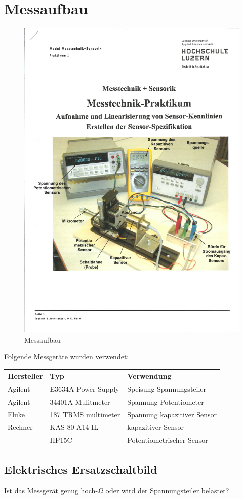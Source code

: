 \section{Messaufbau}


\begin{figure}[H]
    \centering
    \includegraphics[scale=0.8,trim={0.5cm 6cm 0 10.5cm},clip]{pic/aufbau.pdf}
    \caption{Messaufbau}
    \label{fig:messaufbau}
\end{figure}

Folgende Messgeräte wurden verwendet: \\

\begin{tabular}{ l | l | l}
    \hline
    Hersteller & Typ                 & Verwendung                  \\ \hline
    Agilent    & E3634A Power Supply & Speisung Spannungsteiler    \\ \hline
    Agilent    & 34401A Mulitmeter   & Spannung Potentiometer      \\ \hline
    Fluke      & 187 TRMS multimeter & Spannung kapazitiver Sensor \\ \hline
    Rechner    & KAS-80-A14-IL       & kapazitiver Sensor          \\ \hline
    -          & HP15C               & Potentiometrischer Sensor   \\ \hline
\end{tabular}


\subsection{Elektrisches Ersatzschaltbild}


Ist das Messgerät genug hoch-$\Omega$ oder wird der Spannungsteiler belastet?






\clearpage